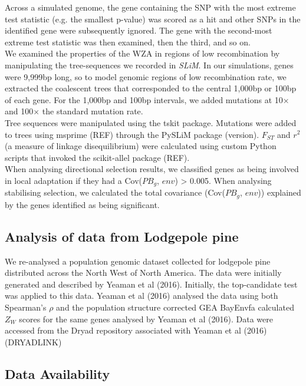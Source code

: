 \documentclass[11pt,twoside,lineno]{GSA_format}
\begin{document}
Across a simulated genome, the gene containing the SNP with the most extreme test statistic (e.g. the smallest p-value) was scored as a hit and other SNPs in the identified gene were subsequently ignored. The gene with the second-most extreme test statistic was then examined, then the third, and so on. \\


We examined the properties of the WZA in regions of low recombination by manipulating the tree-sequences we recorded in \textit{SLiM}. In our simulations, genes were 9,999bp long, so to model genomic regions of low recombination rate, we extracted the coalescent trees that corresponded to the central 1,000bp or 100bp of each gene. For the 1,000bp and 100bp intervals, we added mutations at 10$\times$ and 100$\times$ the standard mutation rate. \\

Tree sequences were manipulated using the tskit package. Mutations were added to trees using msprime (REF) through the PySLiM package (version). $F_{ST}$ and $r^2$ (a measure of linkage disequilibrium) were calculated using custom Python scripts that invoked the scikit-allel package (REF).\\




When analysing directional selection results, we classified genes as being involved in local adaptation if they had a Cov($PB_g$, $env$) > 0.005. When analysing stabilising selection, we calculated the total covariance (Cov($PB_g$, $env$)) explained by the genes identified as being significant.\\



\subsection{Analysis of data from Lodgepole pine}

We re-analysed a population genomic dataset collected for lodgepole pine distributed across the North West of North America. The data were initially generated and described by Yeaman et al (2016). Initially, the top-candidate test was applied to this data. Yeaman et al (2016) analysed the data using both Spearman's $\rho$ and the population structure corrected GEA BayEnvfa
calculated $Z_W$ scores for the same genes analysed by Yeaman et al (2016). Data were accessed from the Dryad repository associated with Yeaman et al (2016) (DRYADLINK)

\subsection{Data Availability}
\end{document}
